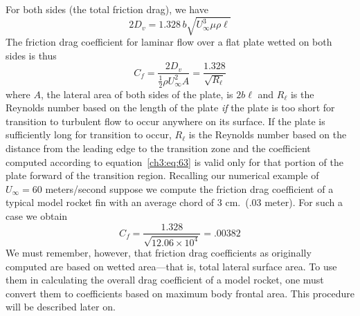 For both sides (the total friction drag), we have
\begin{equation}\label{ch3:eq:62}
2D_v = 1.328\,b\sqrt{U_\infty^3\mu\rho\ell}
\end{equation}
The friction drag coefficient for laminar flow over a flat plate wetted on
both sides is thus
\begin{equation}\label{ch3:eq:63}
C_f = \frac{2D_v}{\tfrac{1}{2}\rho U_\infty^2 A} = \frac{1.328}{\sqrt{R_\ell}}
\end{equation}
where $A$, the lateral area of both sides of the plate, is $2b\ell$ and
$R_\ell$ is the Reynolds number based on the length of the plate \emph{if} the
plate is too short for transition to turbulent flow to occur anywhere on its
surface. If the plate is sufficiently long for transition to occur, $R_\ell$
is the Reynolds number based on the distance from the leading edge to the
transition zone and the coefficient computed according to
equation~\eqref{ch3:eq:63} is valid only for that portion of the plate
forward of the transition region. Recalling our numerical example of
$U_\infty = 60$ meters/second suppose we compute the friction drag coefficient
of a typical model rocket fin with an average chord of 3 cm.\ (.03 meter).
For such a case we obtain
\begin{equation}\label{ch3:eq:64}
C_f = \frac{1.328}{\sqrt{12.06 \times 10^{4}}} = .00382
\end{equation}
We must remember, however, that friction drag coefficients as originally
computed are based on wetted area---that is, total lateral surface area. To
use them in calculating the overall drag coefficient of a model rocket, one
must convert them to coefficients based on maximum body frontal area. This
procedure will be described later on.
